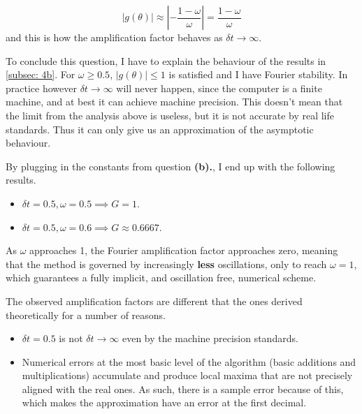 \[
	\left| g(\theta) \right| \approx \left| -\frac{1-\omega}{\omega} \right| = \frac{1-\omega}{\omega}
\]
and this is how the amplification factor behaves as \( \delta t \to \infty \). 

To conclude this question, I have to explain the behaviour of the results in \ref{subsec: 4b}. For \( \omega \geq 0.5 \), \( |g(\theta)| \leq 1 \) is satisfied and I have Fourier stability. In practice however \( \delta t \to \infty \) will never happen, since the computer is a finite machine, and at best it can achieve machine precision. This doesn't mean that the limit from the analysis above is useless, but it is not accurate by real life standards. Thus it can only give us an approximation of the asymptotic behaviour. 

By plugging in the constants from question \textbf{(b).}, I end up with the following results.
\begin{itemize}
	\item \(\delta t = 0.5, \omega = 0.5 \implies G = 1 \). 
	\item \(\delta t = 0.5, \omega = 0.6 \implies G \approx 0.6667 \).
\end{itemize}

As \(\omega\) approaches 1, the Fourier amplification factor approaches zero, meaning that the method is governed by increasingly \textbf{less} oscillations, only to reach \( \omega = 1 \), which guarantees a fully implicit, and oscillation free, numerical scheme.

The observed amplification factors are different that the ones derived theoretically for a number of reasons.
\begin{itemize}
	\item \( \delta t = 0.5 \) is not \( \delta t \to \infty \) even by the machine precision standards.
	\item Numerical errors at the most basic level of the algorithm (basic additions and multiplications) accumulate and produce local maxima that are not precisely aligned with the real ones. As such, there is a sample error because of this, which makes the approximation have an error at the first decimal.
\end{itemize}
